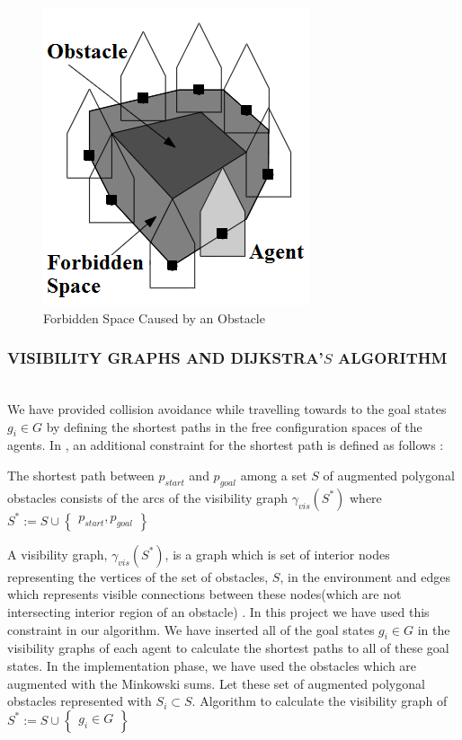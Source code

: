\documentclass[letterpaper, 10 pt, conference]{ieeeconf}  %
\begin{document}
\begin{figure}[thpb]
     \centering
\includegraphics[scale = 0.45]{Forbidden}
  \caption{Forbidden Space Caused by an Obstacle \cite{92}} \label{yasakli_bolge}
\end{figure}
	
\subsubsection{VISIBILITY GRAPHS AND DIJKSTRA'$S$ ALGORITHM}\hspace{0pt} \\
We have provided collision avoidance while travelling towards to the goal states $g_i \in G$ by defining the shortest paths in the free configuration spaces of the agents. In \cite{92}, an additional constraint for the shortest path is defined as follows : 

\begin{displayquote}
The shortest path between $p_{start}$ and $p_{goal}$ among a set $S$ of augmented polygonal obstacles consists of the arcs of the visibility graph $\gamma_{vis}(S^*)$ where $S^* := S \cup \begin{Bmatrix}
p_{start}, p_{goal}
\end{Bmatrix}$
\end{displayquote}

A visibility graph, $\gamma_{vis}(S^*)$, is a graph which is set of interior nodes representing the vertices of the set of obstacles, $S$, in the environment and edges which represents visible connections between these nodes(which are not intersecting interior region of an obstacle) \cite{92}. In this project we have used this constraint in our algorithm. We have inserted all of the goal states $g_i \in G$ in the visibility graphs of each agent to calculate the shortest paths to all of these goal states. In the implementation phase, we have used the obstacles which are augmented with the Minkowski sums. Let these set of augmented polygonal obstacles represented with $S_i \subset S$. Algorithm to calculate the visibility graph of  $S^* := S \cup \begin{Bmatrix}
g_i \in G
\end{Bmatrix}$
	
\end{document}
